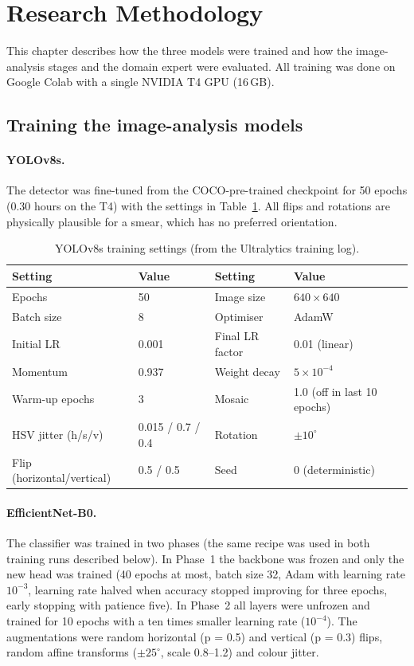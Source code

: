 \section{Research Methodology}\label{sec:method}

This chapter describes how the three models were trained and how the image-analysis stages and the domain expert were evaluated. All training was done on Google Colab with a single NVIDIA T4 GPU (16\,GB).

\subsection{Training the image-analysis models}

\paragraph{YOLOv8s.} The detector was fine-tuned from the COCO-pre-trained  checkpoint for 50 epochs (0.30 hours on the T4) with the settings in Table~\ref{tab:yolo}. All flips and rotations are physically plausible for a smear, which has no preferred orientation.

\begin{table}[H]
\centering
\caption{YOLOv8s training settings (from the Ultralytics training log).}
\label{tab:yolo}
\small
\begin{tabular}{ll@{\hspace{1.5cm}}ll}
\toprule
\textbf{Setting} & \textbf{Value} & \textbf{Setting} & \textbf{Value} \\
\midrule
Epochs & 50 & Image size & $640 \times 640$ \\
Batch size & 8 & Optimiser & AdamW \\
Initial LR & 0.001 & Final LR factor & 0.01 (linear) \\
Momentum & 0.937 & Weight decay & $5 \times 10^{-4}$ \\
Warm-up epochs & 3 & Mosaic & 1.0 (off in last 10 epochs) \\
HSV jitter (h/s/v) & 0.015 / 0.7 / 0.4 & Rotation & $\pm 10^\circ$ \\
Flip (horizontal/vertical) & 0.5 / 0.5 & Seed & 0 (deterministic) \\
\bottomrule
\end{tabular}
\end{table}

\paragraph{EfficientNet-B0.} The classifier was trained in two phases (the same recipe was used in both training runs described below). In Phase~1 the backbone was frozen and only the new head was trained (40 epochs at most, batch size 32, Adam with learning rate $10^{-3}$, learning rate halved when accuracy stopped improving for three epochs, early stopping with patience five). In Phase~2 all layers were unfrozen and trained for 10 epochs with a ten times smaller learning rate ($10^{-4}$). The augmentations were random horizontal (p = 0.5) and vertical (p = 0.3) flips, random affine transforms ($\pm 25^\circ$, scale 0.8--1.2) and colour jitter.

